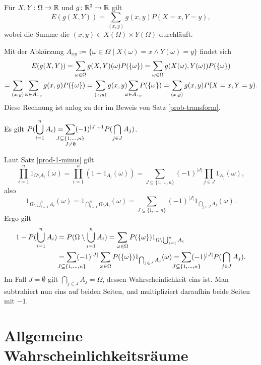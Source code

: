 \begin{Satz}
Für $X,Y\colon\Omega\to\mathbb R$ und $g\colon\mathbb R^2\to\mathbb R$ gilt
\[E(g(X,Y)) = \sum_{(x,y)} g(x,y)P(X=x,Y=y),\]
wobei die Summe die $(x,y)\in X(\Omega)\times Y(\Omega)$ durchläuft.
\end{Satz}
\begin{Beweis}
Mit der Abkürzung $A_{xy}:=\{\omega\in\Omega\mid X(\omega)=x\land Y(\omega)=y\}$
findet sich%
\begin{gather*}
E(g(X,Y)) = \sum_{\omega\in\Omega} g(X,Y)(\omega)P(\{\omega\})
= \sum_{\omega\in\Omega} g(X(\omega),Y(\omega))P(\{\omega\})\\
= \sum_{(x,y)}\sum_{\omega\in A_{xy}} g(x,y)P(\{\omega\})
= \sum_{(x,y)}g(x,y)\sum_{\mathclap{\omega\in A_{xy}}} P(\{\omega\})
= \sum_{(x,y)}g(x,y)P(X=x,Y=y).
\end{gather*}
Diese Rechnung ist anlog zu der im Beweis von Satz \ref{prob-transform}.\,\qedsymbol
\end{Beweis}

\begin{Satz}[Siebformel]\newlinefirst
Es gilt $\displaystyle P(\bigcup_{i=1}^n A_i)
= \sum_{\mathclap{{\scriptstyle J\subseteq\{1,\ldots,n\}}\atop{\scriptstyle J\ne\emptyset}}}
(-1)^{|J|+1}P(\bigcap_{j\in J} A_j)$.
\end{Satz}
\begin{Beweis}
Laut Satz \ref{prod-1-minus} gilt
\[\prod_{i=1}^n 1_{\Omega\setminus A_i}(\omega)
= \prod_{i=1}^n (1-1_{A_i}(\omega))
= \sum_{J\subseteq\{1,\ldots,n\}}(-1)^{|J|}\prod_{j\in J}1_{A_j}(\omega),\]
also
\[1_{\Omega\setminus\bigcup_{i=1}^n A_i}(\omega)
= 1_{\bigcap_{i=1}^n\Omega\setminus A_i}(\omega)
= \sum_{J\subseteq\{1,\ldots,n\}}(-1)^{|J|}1_{\bigcap_{j\in J} A_j}(\omega).\]
Ergo gilt
\begin{align*}
1 - P(\bigcup_{i=1}^n A_i) &= P(\Omega\setminus\bigcup_{i=1}^n A_i)
= \sum_{\omega\in\Omega}P(\{\omega\})1_{\Omega\setminus\bigcup_{i=1}^n A_i}\\
&= \sum_{\mathclap{J\subseteq\{1,\ldots,n\}}}(-1)^{|J|}\sum_{\omega\in\Omega}
P(\{\omega\})1_{\bigcap_{j\in J} A_j}(\omega)
= \sum_{\mathclap{J\subseteq\{1,\ldots,n\}}}(-1)^{|J|}P(\bigcap_{j\in J} A_j).
\end{align*}
Im Fall $J=\emptyset$ gilt $\bigcap_{j\in J} A_j = \Omega$, dessen
Wahrscheinlichkeit eins ist. Man subtrahiert nun eins auf beiden
Seiten, und multipliziert daraufhin beide Seiten mit $-1$.\,\qedsymbol
\end{Beweis}

\newpage
\section{Allgemeine Wahrscheinlichkeitsräume}

